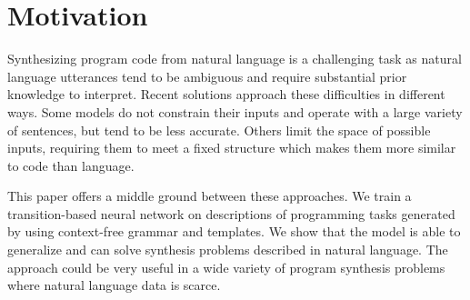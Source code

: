 \section{Motivation}
Synthesizing program code from natural language is a challenging task as natural
language utterances tend to be ambiguous and require substantial prior knowledge
to interpret. Recent solutions approach these difficulties in different ways. Some models do not
constrain their inputs and operate with a large variety of sentences, but tend
to be less accurate. Others limit the space of possible inputs, requiring them
to meet a fixed structure which makes them more similar to code than language.

This paper offers a middle ground between these approaches. We train a
transition-based neural network on descriptions of programming tasks generated by
using context-free grammar and templates. We show that the model is able to
generalize and can solve synthesis problems described in natural language.
The approach could be very useful in a wide variety of program synthesis problems where natural language data is scarce.